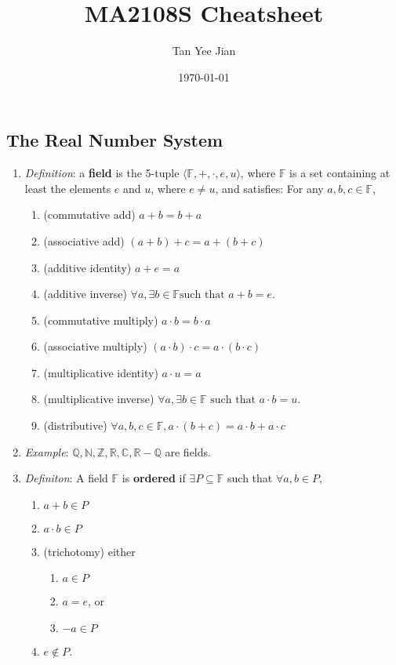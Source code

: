 \documentclass[10pt]{article}
\title{MA2108S Cheatsheet}
\author{Tan Yee Jian}
\date{\today}
\begin{document}

\begin{multicols*}{3}
	\section{The Real Number System}
	\begin{enumerate}
		\item \emph{Definition}: a \textbf{field} is the 5-tuple
		      \(\langle\mathbb{F},+,\cdot,e,u\rangle\), where \(\mathbb{F}\) is a
		      set containing at least the elements $e$ and $u$, where $e\neq u$,
		      and satisfies: For any $a,b,c\in\mathbb{F}$,
		      \begin{enumerate}
			      \item (commutative add) $a+b=b+a$
			      \item (associative add) $(a+b)+c=a+(b+c)$
			      \item (additive identity) $a+e=a$
			      \item (additive inverse) $\forall a,\exists b\in\mathbb{F}\text{
					            such that } a+b=e.$
			      \item (commutative multiply) $a\cdot b=b\cdot a$
			      \item (associative multiply) $(a\cdot b)\cdot c=a\cdot (b\cdot c)$
			      \item (multiplicative identity) $a\cdot u=a$
			      \item (multiplicative inverse) $\forall a,\exists b\in\mathbb{F}
				            \text{ such that } a\cdot b=u.$
			      \item (distributive) $\forall a,b,c\in\mathbb{F},
				            a\cdot(b+c)=a\cdot b+a\cdot c$
		      \end{enumerate}

		\item \emph{Example}: $\mathbb{Q}, \mathbb{N}, \mathbb{Z}, \mathbb{R},
			      \mathbb{C}, \mathbb{R} -\mathbb{Q} $ are fields.
		\item \emph{Definiton}: A field $\mathbb{F}$ is \textbf{ordered} if $\exists
			      P\subseteq \mathbb{F}$ such that $\forall a,b\in P$,
		      \begin{enumerate}
			      \item $a+b\in P$
			      \item $a\cdot b\in P$
			      \item (trichotomy) either
			            \begin{enumerate}
				            \item $a\in P$
				            \item $a=e$, or
				            \item $-a\in P$
			            \end{enumerate}
			      \item $e\notin P$.
		      \end{enumerate}


\end{enumerate}
\end{multicols*}
\end{document}
